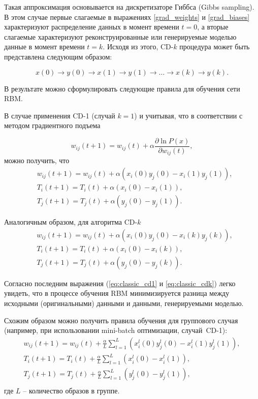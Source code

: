 Такая аппроксимация основывается на дискретизаторе Гиббса (Gibbs sampling). В этом случае первые слагаемые в выражениях \ref{grad_weights} и \ref{grad_biases} характеризуют распределение данных в момент времени $t=0$, а вторые слагаемые характеризуют реконструированные или генерируемые моделью данные в момент времени $t=k$. Исходя из этого, CD-$k$ процедура может быть представлена следующим образом:
	
\begin{equation}
	x(0) \rightarrow y(0) \rightarrow x(1) \rightarrow y(1) \rightarrow \ldots \rightarrow x(k) \rightarrow y(k).
\end{equation}
	
В результате можно сформулировать следующие правила для обучения сети RBM. 

В случае применения CD-1 (случай $k=1$) и учитывая, что в соответствии с методом градиентного подъема
	
\begin{equation*}
	w_{ij}(t+1)=w_{ij}(t)+\alpha\frac{\partial \ln P(x)}{\partial w_{ij}(t)},
\end{equation*}	 
можно получить, что
\begin{equation}
	\label{eq:classic_cd1}
	\begin{aligned}
		& w_{ij}(t+1)=w_{ij}(t)+\alpha(x_i(0)y_j(0)-x_i(1)y_j(1)),\\		
		& T_i(t+1)=T_i(t)+\alpha(x_i(0)-x_i(1)),\\	
		& T_j(t+1)=T_j(t)+\alpha(y_j(0)-y_j(1)).
	\end{aligned}		
\end{equation}

	Аналогичным образом, для алгоритма  CD-$k$
\begin{equation}
	\label{eq:classic_cdk}
	\begin{aligned}
		& w_{ij}(t+1)=w_{ij}(t)+\alpha(x_i(0)y_j(0)-x_i(k)y_j(k)),\\
		& T_i(t+1)=T_i(t)+\alpha(x_i(0)-x_i(k)),\\		
		& T_j(t+1)=T_j(t)+\alpha(y_j(0)-y_j(k)).
	\end{aligned}
\end{equation} 
	
Согласно последним выражения (\ref{eq:classic_cd1} и \ref{eq:classic_cdk}) легко увидеть, что в процессе обучения RBM минимизируется разница между исходными (оригинальными) данными и данными, генерируемыми моделью.

Схожим образом можно получить правила обучения для группового случая (например, при использовании mini-batch оптимизации, случай~\mbox{CD-1}):
\begin{gather*}
		w_{ij}(t+1)=w_{ij}(t)+\frac{\alpha}{L}\sum_{l=1}^L(x_i^l(0)y_j^l(0)-x_i^l(1)y_j^l(1)),\\	
		T_i(t+1)=T_i(t)+\frac{\alpha}{L}\sum_{l=1}^L(x_i^l(0)-x_i^l(1)),\\
		T_j(t+1)=T_j(t)+\frac{\alpha}{L}\sum_{l=1}^L(y_j^l(0)-y_j^l(1)),\\
\end{gather*}	
где $L$ -- количество образов в группе.
	
